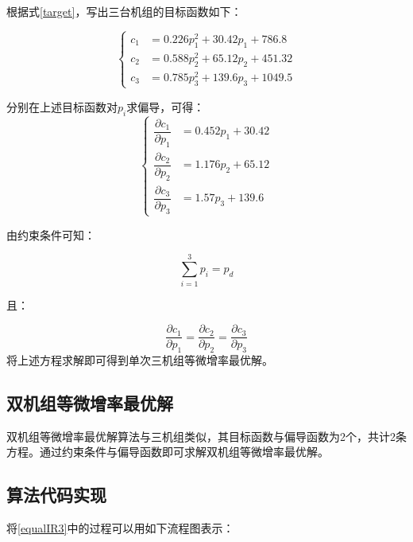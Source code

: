 \documentclass{cumcmthesis}
\begin{document}
  根据式\ref{target}，写出三台机组的目标函数如下：
  
  \begin{equation}\label{key}
  	\left\{\begin{matrix}
  		c_{1}&=0.226 p_{1}^{2} + 30.42 p_{1} + 786.8\\
  		c_{2}&=0.588 p_{2}^{2} + 65.12 p_{2} + 451.32\\
  		c_{3}&=0.785 p_{3}^{2} + 139.6 p_{3} + 1049.5
  	\end{matrix}\right.
  \end{equation}
  
  分别在上述目标函数对$ p_{i} $求偏导，可得：
  \begin{equation}\label{key}
  	\left\{\begin{matrix}
  		\dfrac{\partial c_{1}}{\partial p_{1}}&=0.452 p_{1} + 30.42\\
  		\dfrac{\partial c_{2}}{\partial p_{2}}&=1.176 p_{2} + 65.12\\
  		\dfrac{\partial c_{3}}{\partial p_{3}}&=1.57 p_{3} + 139.6
  	\end{matrix}\right.
  \end{equation}
  
  由约束条件可知：
  
  \begin{equation}\label{key}
  	\sum_{i=1}^{3}p_{i}=p_{d}
  \end{equation}
  
  且：
  
  \begin{equation}\label{key}
  	\dfrac{\partial c_{1}}{\partial p_{1}}=\dfrac{\partial c_{2}}{\partial p_{2}}=\dfrac{\partial c_{3}}{\partial p_{3}}
  \end{equation}
  将上述方程求解即可得到单次三机组等微增率最优解。
  
  \subsection{双机组等微增率最优解}\label{sjzdwzl}
  双机组等微增率最优解算法与三机组类似，其目标函数与偏导函数为2个，共计2条方程。通过约束条件与偏导函数即可求解双机组等微增率最优解。
  
  \subsection{算法代码实现}
  将\ref{equalIR3}中的过程可以用如下流程图表示：
  
\end{document}

